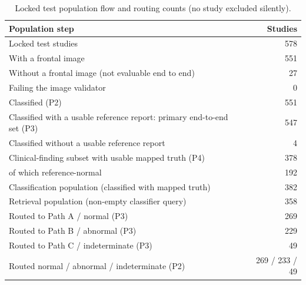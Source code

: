 \begin{table}[t]
\centering
\scriptsize
\begin{tabular}{lr}
\hline
Population step & Studies \\
\hline
Locked test studies & 578 \\
With a frontal image & 551 \\
Without a frontal image (not evaluable end to end) & 27 \\
Failing the image validator & 0 \\
Classified (P2) & 551 \\
Classified with a usable reference report: primary end-to-end set (P3) & 547 \\
Classified without a usable reference report & 4 \\
Clinical-finding subset with usable mapped truth (P4) & 378 \\
  of which reference-normal & 192 \\
Classification population (classified with mapped truth) & 382 \\
Retrieval population (non-empty classifier query) & 358 \\
Routed to Path A / normal (P3) & 269 \\
Routed to Path B / abnormal (P3) & 229 \\
Routed to Path C / indeterminate (P3) & 49 \\
Routed normal / abnormal / indeterminate (P2) & 269 / 233 / 49 \\
\hline
\end{tabular}
\caption{Locked test population flow and routing counts (no study excluded silently).}
\label{tab:table1_locked_test_population}
\end{table}
